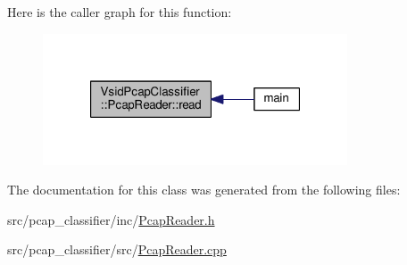 Here is the caller graph for this function\-:
\nopagebreak
\begin{figure}[H]
\begin{center}
\leavevmode
\includegraphics[width=256pt]{class_vsid_pcap_classifier_1_1_pcap_reader_a8d73bbb229734e2bacce29f212ca2f6d_icgraph}
\end{center}
\end{figure}




The documentation for this class was generated from the following files\-:\begin{DoxyCompactItemize}
\item 
src/pcap\-\_\-classifier/inc/\hyperlink{pcap__classifier_2inc_2_pcap_reader_8h}{Pcap\-Reader.\-h}\item 
src/pcap\-\_\-classifier/src/\hyperlink{pcap__classifier_2src_2_pcap_reader_8cpp}{Pcap\-Reader.\-cpp}\end{DoxyCompactItemize}
